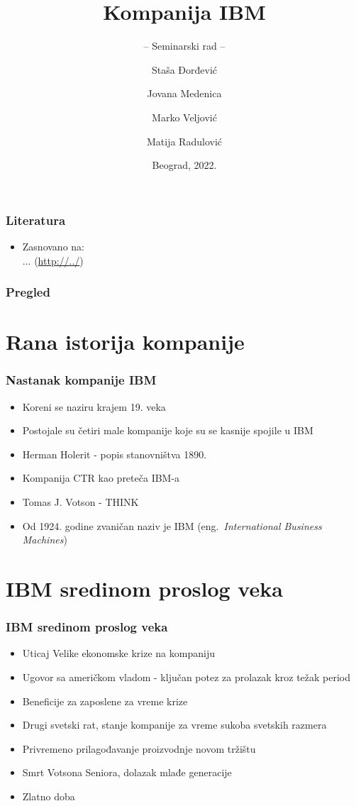 \documentclass{beamer}
\title[]{Kompanija IBM}
\subtitle{-- Seminarski rad --}
\author[]{Staša Đorđević\and
Jovana Medenica\\\and  
Marko Veljović\and
Matija Radulović}
\institute[]{Matematički fakultet\\Univerzitet u Beogradu}
\date{
    \footnotesize{Beograd, 2022.}	
}
\begin{document}
\begin{frame}
	\thispagestyle{empty}
	\titlepage
\end{frame}

\begin{frame}[fragile]\frametitle{Literatura}
	\begin{itemize}
		\item Zasnovano na:\\
		...
		(\url{http://../})
	\end{itemize}
\end{frame}

\begin{frame}
	\frametitle{Pregled} %
	\tableofcontents[hidesubsections] 
\end{frame}

\section{Rana istorija kompanije}

\begin{frame}[fragile]\frametitle{Nastanak kompanije IBM}
	\begin{itemize}	
		\item Koreni se naziru krajem 19. veka
		\item Postojale su četiri male kompanije koje su se kasnije spojile u IBM
		\item Herman Holerit - popis stanovništva 1890.
		\item Kompanija CTR kao preteča IBM-a
		\item Tomas J. Votson - THINK
		\item Od 1924. godine zvaničan naziv je IBM (eng.~{\em International Business Machines})
		\end{itemize}
\end{frame}

\section{IBM sredinom proslog veka}

\begin{frame}[fragile]\frametitle{IBM sredinom proslog veka}
	\begin{itemize}	
		\item Uticaj Velike ekonomske krize na kompaniju
		\item Ugovor sa američkom vladom - ključan potez za prolazak kroz težak period
		\item Beneficije za zaposlene za vreme krize
            \item Drugi svetski rat, stanje kompanije za vreme sukoba svetskih razmera
            \item Privremeno prilagođavanje proizvodnje novom tržištu
            \item Smrt Votsona Seniora, dolazak mlađe generacije
            \item Zlatno doba
	\end{itemize}
\end{frame}
\end{document}
